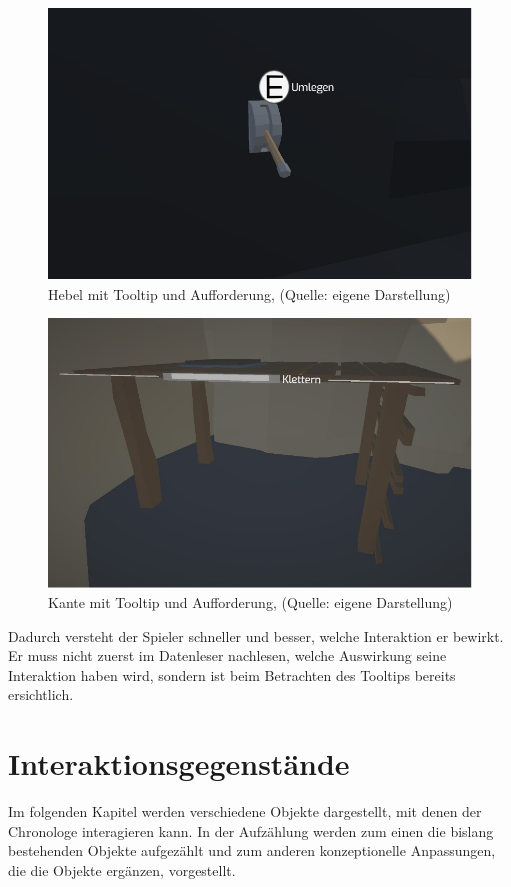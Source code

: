 \begin{figure}[ht]
\centering
\includegraphics[width=0.8\linewidth]{content/pictures/lever_tooltip_title.jpg}
\caption{Hebel mit Tooltip und Aufforderung, (Quelle: eigene Darstellung)}
\label{fig:lever_tooltip_title}
\end{figure}

\begin{figure}[ht]
\centering
\includegraphics[width=0.8\linewidth]{content/pictures/leadge_tooltip_title.jpg}
\caption{Kante mit Tooltip und Aufforderung, (Quelle: eigene Darstellung)}
\label{fig:leadge_title}
\end{figure}

Dadurch versteht der Spieler schneller und besser, welche Interaktion er bewirkt. Er muss nicht zuerst im Datenleser nachlesen, welche Auswirkung seine Interaktion haben wird, sondern ist beim Betrachten des Tooltips bereits ersichtlich.

\section{Interaktionsgegenstände}
Im folgenden Kapitel werden verschiedene Objekte dargestellt, mit denen der Chronologe interagieren kann. In der Aufzählung werden zum einen die bislang bestehenden Objekte aufgezählt und zum anderen konzeptionelle Anpassungen, die die Objekte ergänzen, vorgestellt.
